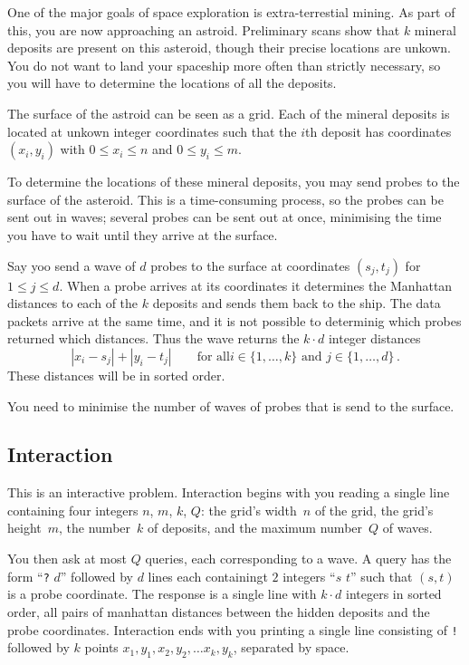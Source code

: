 
One of the major goals of space exploration is extra-terrestial mining. 
As part of this, you are now approaching an astroid. 
Preliminary scans show that $k$ mineral deposits are present on this asteroid, though their precise locations are unkown.
You do not want to land your spaceship more often than strictly necessary, so you will have to determine the locations of all the deposits.

\medskip

The surface of the astroid can be seen as a grid.
Each of the mineral deposits is located at unkown integer coordinates such that the $i$th deposit has coordinates $(x_i,y_i)$ with  $0 \le x_i \le n$ and $0\le y_i \le m$.

To determine the locations of these mineral deposits, you may send probes to the surface of the asteroid. 
This is a time-consuming process, so the probes can be sent out in waves;
several probes can be sent out at once, minimising the time you have to wait until they arrive at the surface.

Say yoo send a wave of $d$ probes to the surface at coordinates $(s_j,t_j)$ for $1\leq j\leq d$.
When a probe arrives at its coordinates it determines the Manhattan distances to each of the $k$ deposits and sends them back to the ship. 
The data packets arrive at the same time, and it is not possible to determinig which probes returned which distances. 
Thus the wave returns the $k\cdot d$ integer distances
\[|x_i-s_j| + |y_i - t_j| \qquad\text{for all} i \in \{1,\ldots,k\} \text{ and } j \in\{ 1,\ldots,d\}\,.\]
These distances will be in sorted order.

You need to minimise the number of waves of probes that is send to the surface.

\subsection*{Interaction}

This is an interactive problem.
Interaction begins with you reading a single line containing four integers $n$, $m$, $k$, $Q$:
the grid's width~$n$ of the grid,
the grid's height~$m$, the number~$k$ of deposits, and the maximum number~$Q$ of waves.

You then ask at most $Q$ queries, each corresponding to a wave.
A query has the form ``\texttt{?} $d$'' followed by $d$ lines each containingt $2$ integers ``$s$ $t$'' such that $(s,t)$ is a probe coordinate.
The response is a single line with $k \cdot d$ integers in sorted order, all pairs of manhattan distances between the hidden deposits and the probe coordinates.
Interaction ends with you printing a single line consisting of \texttt{!} followed by $k$ points $x_1, y_1, x_2, y_2, \ldots x_k, y_k$, separated by space.

